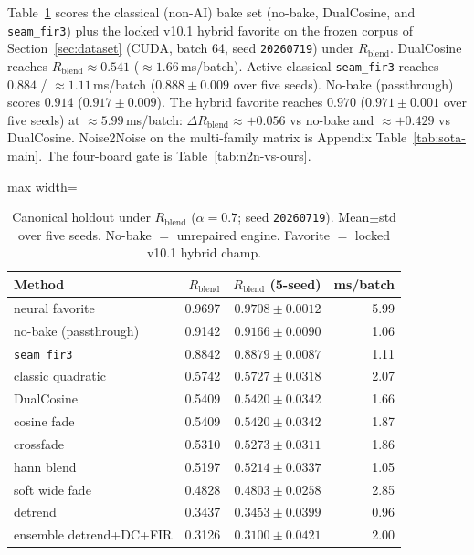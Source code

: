 \label{sec:classical-vs-favorite}
Table~\ref{tab:canonical-methods} scores the classical (non-AI) bake set (no-bake, DualCosine, and \texttt{seam\_fir3}) plus the locked v10.1 hybrid favorite on the frozen corpus of Section~\ref{sec:dataset} (CUDA, batch 64, seed \texttt{20260719}) under $R_{\mathrm{blend}}$.
DualCosine reaches $R_{\mathrm{blend}}\approx 0.541$ ($\approx 1.66$\,ms/batch).
Active classical \texttt{seam\_fir3} reaches $0.884$ / $\approx 1.11$\,ms/batch ($0.888\pm0.009$ over five seeds).
No-bake (passthrough) scores $0.914$ ($0.917\pm0.009$).
The hybrid favorite reaches $0.970$ ($0.971\pm0.001$ over five seeds) at $\approx 5.99$\,ms/batch:
$\Delta R_{\mathrm{blend}} \approx {+}0.056$ vs no-bake and $\approx {+}0.429$ vs DualCosine.
Noise2Noise on the multi-family matrix is Appendix Table~\ref{tab:sota-main}. The four-board gate is Table~\ref{tab:n2n-vs-ours}.

\begin{table}[htbp]
  \centering
  \caption{Canonical holdout under $R_{\mathrm{blend}}$ ($\alpha{=}0.7$; seed \texttt{20260719}). Mean$\pm$std over five seeds. No-bake $=$ unrepaired engine. Favorite $=$ locked v10.1 hybrid champ.}
  \label{tab:canonical-methods}
  \setlength{\tabcolsep}{6pt}
  \begin{adjustbox}{max width=\columnwidth}
\begin{tabular}{@{}lrrr@{}}
    \toprule
    Method & $R_{\mathrm{blend}}$ & $R_{\mathrm{blend}}$ (5-seed) & ms/batch \\
    \midrule
    neural favorite & 0.9697 & $0.9708\pm0.0012$ & 5.99 \\
    no-bake (passthrough) & 0.9142 & $0.9166\pm0.0090$ & 1.06 \\
    \texttt{seam\_fir3} & 0.8842 & $0.8879\pm0.0087$ & 1.11 \\
    classic quadratic & 0.5742 & $0.5727\pm0.0318$ & 2.07 \\
    DualCosine & 0.5409 & $0.5420\pm0.0342$ & 1.66 \\
    cosine fade & 0.5409 & $0.5420\pm0.0342$ & 1.87 \\
    crossfade & 0.5310 & $0.5273\pm0.0311$ & 1.86 \\
    hann blend & 0.5197 & $0.5214\pm0.0337$ & 1.05 \\
    soft wide fade & 0.4828 & $0.4803\pm0.0258$ & 2.85 \\
    detrend & 0.3437 & $0.3453\pm0.0399$ & 0.96 \\
    ensemble detrend{+}DC{+}FIR & 0.3126 & $0.3100\pm0.0421$ & 2.00 \\
    \bottomrule
  \end{tabular}
\end{adjustbox}
\end{table}




